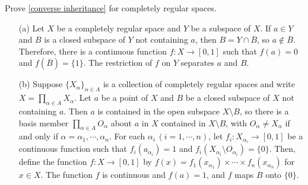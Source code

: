 \begin{prob}\label{inheritance - completely regular}
    Prove \cref{converse inheritance} for completely regular spaces.
\end{prob}
\begin{enumerate}
    \item[(a)]
    {
        Let $X$ be a completely regular space and $Y$ be a subspace of $X$.
        If $a\in Y$ and $B$ is a closed subspace of $Y$ not containing $a$, then $B=Y\cap\overline{B}$, so $a\notin\overline{B}$.
        Therefore, there is a continuous function $f: X\rightarrow[0, 1]$ such that $f(a)=0$ and $f(\overline{B})=\{1\}$.
        The restriction of $f$ on $Y$ separates $a$ and $B$.
    }
    \item[(b)]
    {
        Suppose $\{X_\alpha\}_{\alpha\in A}$ is a collection of completely regular spaces and write $X=\prod_{\alpha\in A}X_\alpha$.
        Let $a$ be a point of $X$ and $B$ be a closed subspace of $X$ not containing $a$.
        Then $a$ is contained in the open subspace $X\setminus B$, so there is a basis member $\prod_{\alpha\in A} O_\alpha$ about $a$ in $X$ contained in $X\setminus B$, with $O_\alpha\neq X_\alpha$ if and only if $\alpha=\alpha_1, \cdots, \alpha_n$.
        For each $\alpha_i\,(i=1, \cdots, n)$, let $f_i: X_{\alpha_i}\rightarrow[0, 1]$ be a continuous function such that $f_i(a_{\alpha_i})=1$ and $f_i(X_{\alpha_i}\setminus O_{\alpha_i})=\{0\}$.
        Then, define the function $f: X\rightarrow[0, 1]$ by $f(x)=f_1(x_{\alpha_1})\times\cdots\times f_n(x_{\alpha_n})$ for $x\in X$.
        The function $f$ is continuous and $f(a)=1$, and $f$ maps $B$ onto $\{0\}$.
    }
\end{enumerate}

